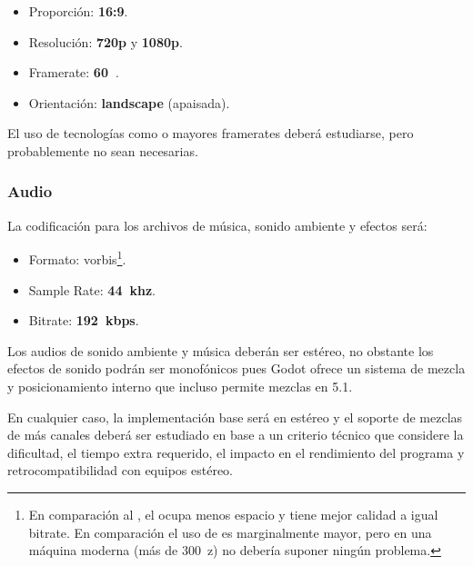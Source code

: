 \begin{itemize}
\item Proporción: \textbf{16:9}.

\item Resolución: \textbf{720p} y \textbf{1080p}.

\item Framerate: \textbf{60~}.

\item Orientación: \textbf{landscape} (apaisada).
\end{itemize}

El uso de tecnologías como  o mayores framerates deberá estudiarse, pero probablemente no sean necesarias.

\subsubsection{Audio}
\noindent La codificación para los archivos de música, sonido ambiente y efectos será:
\begin{itemize}
\item Formato: \textbf{} vorbis\footnote{En comparación al , el  ocupa menos espacio y tiene mejor calidad a igual bitrate. En comparación el uso de  es marginalmente mayor, pero en una máquina moderna (más de 300~z) no debería suponer ningún problema.}.

\item Sample Rate: \textbf{44~khz}.

\item Bitrate: \textbf{192~kbps}.
\end{itemize}

Los audios de sonido ambiente y música deberán ser estéreo, no obstante los efectos de sonido podrán ser monofónicos pues Godot ofrece un sistema de mezcla y posicionamiento interno que incluso permite mezclas en 5.1.

En cualquier caso, la implementación base será en estéreo y el soporte de mezclas de más canales deberá ser estudiado en base a un criterio técnico que considere la dificultad, el tiempo extra requerido, el impacto en el rendimiento del programa y retrocompatibilidad con equipos estéreo.

